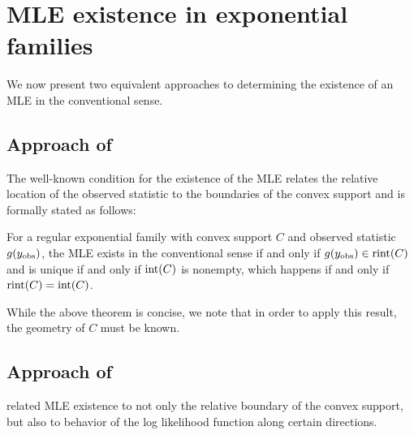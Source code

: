 
\section{MLE existence in exponential families} \label{S:MLE existence}
We now present two equivalent approaches to determining the existence of an MLE
in the conventional sense.  

\subsection{Approach of \citet{Barndorff}}
The well-known condition for the existence of the MLE 
relates the relative location of the observed statistic to the boundaries of 
the convex support and is formally stated as follows:
\begin{theorem} \label{Thm:MLE rint}
For a regular exponential family with convex support $C$ and observed statistic $g(y_{\text{obs}})$, the MLE exists in the conventional sense if and only if 
$g(y_{\text{obs}}) \in \operatorname{rint}(C)$ and is unique if and only if $\operatorname{int}(C)$ is nonempty, which
happens if and only if $\operatorname{rint}(C) = \operatorname{int}(C)$. 
\end{theorem}

While the above theorem is concise, we note that in order to apply this result, 
the geometry of $C$ must be known.

\subsection{Approach of \citet{Geyer:gdor}}
\citet{Geyer:1990,Geyer:gdor} related MLE existence to
 not only the relative boundary of the convex support, 
 but also to behavior of the log likelihood function along certain directions.

